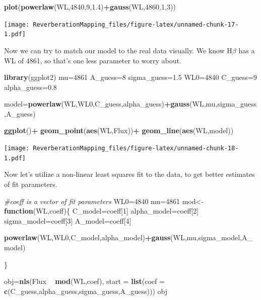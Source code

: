 \documentclass[]{article}
\newenvironment{Shaded}{\begin{snugshade}}{\end{snugshade}}
\newcommand{\CommentTok}[1]{\textcolor[rgb]{0.56,0.35,0.01}{\textit{#1}}}
\newcommand{\ControlFlowTok}[1]{\textcolor[rgb]{0.13,0.29,0.53}{\textbf{#1}}}
\newcommand{\DataTypeTok}[1]{\textcolor[rgb]{0.13,0.29,0.53}{#1}}
\newcommand{\DecValTok}[1]{\textcolor[rgb]{0.00,0.00,0.81}{#1}}
\newcommand{\FloatTok}[1]{\textcolor[rgb]{0.00,0.00,0.81}{#1}}
\newcommand{\KeywordTok}[1]{\textcolor[rgb]{0.13,0.29,0.53}{\textbf{#1}}}
\newcommand{\NormalTok}[1]{#1}
\newcommand{\OperatorTok}[1]{\textcolor[rgb]{0.81,0.36,0.00}{\textbf{#1}}}
\newcommand{\StringTok}[1]{\textcolor[rgb]{0.31,0.60,0.02}{#1}}
\begin{document}
\begin{Shaded}
\begin{Highlighting}[]
\KeywordTok{plot}\NormalTok{(}\KeywordTok{powerlaw}\NormalTok{(WL,}\DecValTok{4840}\NormalTok{,}\DecValTok{9}\NormalTok{,}\FloatTok{1.4}\NormalTok{)}\OperatorTok{+}\KeywordTok{gauss}\NormalTok{(WL,}\DecValTok{4860}\NormalTok{,}\DecValTok{1}\NormalTok{,}\DecValTok{3}\NormalTok{))}
\end{Highlighting}
\end{Shaded}

\texttt{[image: ReverberationMapping\_files/figure-latex/unnamed-chunk-17-1.pdf]}

Now we can try to match our model to the real data visually. We know
H\(\beta\) has a WL of 4861, so that's one less parameter to worry
about.

\begin{Shaded}
\begin{Highlighting}[]
\KeywordTok{library}\NormalTok{(ggplot2)}
\NormalTok{mu=}\DecValTok{4861}
\NormalTok{A_guess=}\DecValTok{8}
\NormalTok{sigma_guess=}\FloatTok{1.5}
\NormalTok{WL0=}\DecValTok{4840}
\NormalTok{C_guess=}\DecValTok{9}
\NormalTok{alpha_guess=}\FloatTok{0.8}

\NormalTok{model=}\KeywordTok{powerlaw}\NormalTok{(WL,WL0,C_guess,alpha_guess)}\OperatorTok{+}\KeywordTok{gauss}\NormalTok{(WL,mu,sigma_guess,A_guess)}


\KeywordTok{ggplot}\NormalTok{()}\OperatorTok{+}
\StringTok{  }\KeywordTok{geom_point}\NormalTok{(}\KeywordTok{aes}\NormalTok{(WL,Flux))}\OperatorTok{+}
\StringTok{  }\KeywordTok{geom_line}\NormalTok{(}\KeywordTok{aes}\NormalTok{(WL,model))}
\end{Highlighting}
\end{Shaded}

\texttt{[image: ReverberationMapping\_files/figure-latex/unnamed-chunk-18-1.pdf]}

Now let's utilize a non-linear least squares fit to the data, to get
better estimates of fit parameters.

\begin{Shaded}
\begin{Highlighting}[]
\CommentTok{#coeff is a vector of fit parameters}
\NormalTok{WL0=}\DecValTok{4840}
\NormalTok{mu=}\DecValTok{4861}
\NormalTok{mod<-}\ControlFlowTok{function}\NormalTok{(WL,coeff)\{}
\NormalTok{  C_model=coeff[}\DecValTok{1}\NormalTok{]}
\NormalTok{  alpha_model=coeff[}\DecValTok{2}\NormalTok{]}
\NormalTok{  sigma_model=coeff[}\DecValTok{3}\NormalTok{]}
\NormalTok{  A_model=coeff[}\DecValTok{4}\NormalTok{]}
  
  \KeywordTok{powerlaw}\NormalTok{(WL,WL0,C_model,alpha_model)}\OperatorTok{+}\KeywordTok{gauss}\NormalTok{(WL,mu,sigma_model,A_model)}
  
\NormalTok{\}}


\NormalTok{obj=}\KeywordTok{nls}\NormalTok{(Flux }\OperatorTok{~}\StringTok{ }\KeywordTok{mod}\NormalTok{(WL,coef), }\DataTypeTok{start =} \KeywordTok{list}\NormalTok{(}\DataTypeTok{coef =} \KeywordTok{c}\NormalTok{(C_guess,alpha_guess,sigma_guess,A_guess)))}
\NormalTok{obj}
\end{Highlighting}
\end{Shaded}
\end{document}

